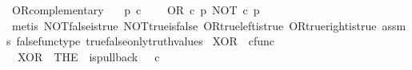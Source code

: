 \begin{isabellebody}
\endisatagproof
{\isafoldproof}%
%
\isadelimproof
\isanewline
%
\endisadelimproof
\isanewline
{}\isamarkupfalse%
\ OR{\isacharunderscore}{\kern0pt}complementary{\isacharcolon}{\kern0pt}\isanewline
\ \ \ {\isachardoublequoteopen}p\ {\isasymin}\isactrlsub c\ {\isasymOmega}{\isachardoublequoteclose}\isanewline
\ \ \ {\isachardoublequoteopen}OR\ {\isasymcirc}\isactrlsub c\ {\isasymlangle}p{\isacharcomma}{\kern0pt}\ NOT\ {\isasymcirc}\isactrlsub c\ p{\isasymrangle}\ {\isacharequal}{\kern0pt}\ \ {\isasymt}{\isachardoublequoteclose}\isanewline
%
\isadelimproof
\ \ %
\endisadelimproof
%
\isatagproof
{}\isamarkupfalse%
\ {\isacharparenleft}{\kern0pt}metis\ NOT{\isacharunderscore}{\kern0pt}false{\isacharunderscore}{\kern0pt}is{\isacharunderscore}{\kern0pt}true\ NOT{\isacharunderscore}{\kern0pt}true{\isacharunderscore}{\kern0pt}is{\isacharunderscore}{\kern0pt}false\ OR{\isacharunderscore}{\kern0pt}true{\isacharunderscore}{\kern0pt}left{\isacharunderscore}{\kern0pt}is{\isacharunderscore}{\kern0pt}true\ OR{\isacharunderscore}{\kern0pt}true{\isacharunderscore}{\kern0pt}right{\isacharunderscore}{\kern0pt}is{\isacharunderscore}{\kern0pt}true\ assms\ false{\isacharunderscore}{\kern0pt}func{\isacharunderscore}{\kern0pt}type\ true{\isacharunderscore}{\kern0pt}false{\isacharunderscore}{\kern0pt}only{\isacharunderscore}{\kern0pt}truth{\isacharunderscore}{\kern0pt}values{\isacharparenright}{\kern0pt}%
\endisatagproof
{\isafoldproof}%
%
\isadelimproof
%
\endisadelimproof
%
\isadelimdocument
%
\endisadelimdocument
%
\isatagdocument
%
\isamarkuptrue%
%
\endisatagdocument
{\isafolddocument}%
%
\isadelimdocument
%
\endisadelimdocument
{}\isamarkupfalse%
\ XOR\ {\isacharcolon}{\kern0pt}{\isacharcolon}{\kern0pt}\ {\isachardoublequoteopen}cfunc{\isachardoublequoteclose}\ \isanewline
\ \ {\isachardoublequoteopen}XOR\ {\isacharequal}{\kern0pt}\ {\isacharparenleft}{\kern0pt}THE\ {\isasymchi}{\isachardot}{\kern0pt}\ is{\isacharunderscore}{\kern0pt}pullback\ {\isacharparenleft}{\kern0pt}{\isasymone}{\isasymCoprod}{\isasymone}{\isacharparenright}{\kern0pt}\ {\isasymone}\ {\isacharparenleft}{\kern0pt}{\isasymOmega}{\isasymtimes}\isactrlsub c{\isasymOmega}{\isacharparenright}{\kern0pt}\ {\isasymOmega}\ {\isacharparenleft}{\kern0pt}{\isasymbeta}\isactrlbsub {\isacharparenleft}{\kern0pt}{\isasymone}{\isasymCoprod}{\isasymone}{\isacharparenright}{\kern0pt}\isactrlesub {\isacharparenright}{\kern0pt}\ {\isasymt}\ {\isacharparenleft}{\kern0pt}{\isasymlangle}{\isasymt}{\isacharcomma}{\kern0pt}\ {\isasymf}{\isasymrangle}\ {\isasymamalg}{\isasymlangle}{\isasymf}{\isacharcomma}{\kern0pt}\ {\isasymt}{\isasymrangle}{\isacharparenright}{\kern0pt}\ {\isasymchi}{\isacharparenright}{\kern0pt}{\isachardoublequoteclose}\isanewline

\end{isabellebody}
